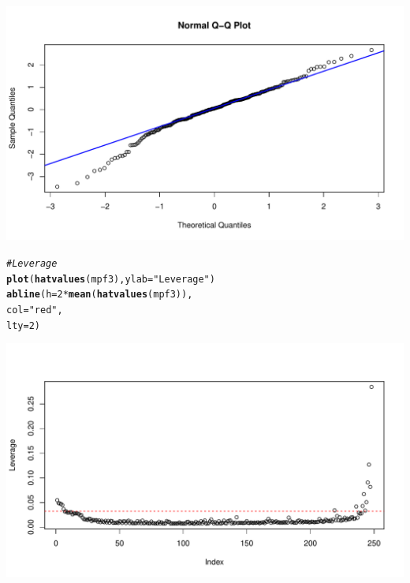 \documentclass[oneside]{book}\usepackage[]{graphicx}\usepackage[dvipsnames,table,xcdraw]{xcolor}
\makeatletter
\def\maxwidth{ %
  \ifdim\Gin@nat@width>\linewidth
    \linewidth
  \else
    \Gin@nat@width
  \fi
}
\newcommand{\hlnum}[1]{\textcolor[rgb]{0.686,0.059,0.569}{#1}}%
\newcommand{\hlstr}[1]{\textcolor[rgb]{0.192,0.494,0.8}{#1}}%
\newcommand{\hlcom}[1]{\textcolor[rgb]{0.678,0.584,0.686}{\textit{#1}}}%
\newcommand{\hlopt}[1]{\textcolor[rgb]{0,0,0}{#1}}%
\newcommand{\hlstd}[1]{\textcolor[rgb]{0.345,0.345,0.345}{#1}}%
\newcommand{\hlkwc}[1]{\textcolor[rgb]{0.333,0.667,0.333}{#1}}%
\newcommand{\hlkwd}[1]{\textcolor[rgb]{0.737,0.353,0.396}{\textbf{#1}}}%
\newenvironment{kframe}{%
 \def\at@end@of@kframe{}%
 \ifinner\ifhmode%
  \def\at@end@of@kframe{\end{minipage}}%
  \begin{minipage}{\columnwidth}%
 \fi\fi%
 \def\FrameCommand##1{\hskip\@totalleftmargin \hskip-\fboxsep
 \colorbox{shadecolor}{##1}\hskip-\fboxsep
     \hskip-\linewidth \hskip-\@totalleftmargin \hskip\columnwidth}%
 \MakeFramed {\advance\hsize-\width
   \@totalleftmargin\z@ \linewidth\hsize
   \@setminipage}}%
 {\par\unskip\endMakeFramed%
 \at@end@of@kframe}
\newenvironment{knitrout}{}{} %
\makeatother
\begin{document}
\begin{knitrout}
{\centering \includegraphics[width=\maxwidth]{figure/unnamed-chunk-58-2} 

}


\begin{kframe}\begin{alltt}
\hlcom{# Leverage}
\hlkwd{plot}\hlstd{(}\hlkwd{hatvalues}\hlstd{(mpf3),} \hlkwc{ylab} \hlstd{=} \hlstr{"Leverage"}\hlstd{)}
\hlkwd{abline}\hlstd{(}\hlkwc{h} \hlstd{=} \hlnum{2} \hlopt{*} \hlkwd{mean}\hlstd{(}\hlkwd{hatvalues}\hlstd{(mpf3)),}
\hlkwc{col} \hlstd{=} \hlstr{"red"}\hlstd{,}
\hlkwc{lty} \hlstd{=} \hlnum{2}\hlstd{)}
\end{alltt}
\end{kframe}

{\centering \includegraphics[width=\maxwidth]{figure/unnamed-chunk-58-3} 

}



\end{knitrout}
\end{document}
